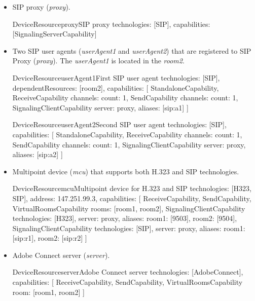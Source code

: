 \begin{itemize}
\item SIP proxy (\emph{proxy}).

\begin{ResourceExample}{DeviceResource}{proxy}{SIP proxy}
technologies: [SIP], 
capabilities: [SignalingServerCapability]
\end{ResourceExample}

\item Two SIP user agents (\emph{userAgent1} and \emph{userAgent2}) that are
  registered to SIP Proxy (\emph{proxy}). The \emph{userAgent1} is located in
  the \emph{room2}.
  
\begin{ResourceExample}{DeviceResource}{userAgent1}{First SIP user agent}
technologies: [SIP],
dependentResources: [room2],
capabilities: [
  StandaloneCapability,
  ReceiveCapability {channels: {count: 1}},
  SendCapability {channels: {count: 1}},
  SignalingClientCapability {server: proxy, aliases: [sip:a1]}
]
\end{ResourceExample}

\begin{ResourceExample}{DeviceResource}{userAgent2}{Second SIP user agent}
technologies: [SIP],
capabilities: [
  StandaloneCapability,
  ReceiveCapability {channels: {count: 1}},
  SendCapability {channels: {count: 1}},
  SignalingClientCapability {server: proxy, aliases: [sip:a2]}
]
\end{ResourceExample}

\item Multipoint device (\emph{mcu}) that supports both H.323 and SIP 
  technologies.
  
\begin{ResourceExample}{DeviceResource}{mcu}{Multipoint device for H.323 and SIP}
technologies: [H323, SIP], 
address: 147.251.99.3,
capabilities: [
  ReceiveCapability,
  SendCapability,
  VirtualRoomsCapability {rooms: [room1, room2]},
  SignalingClientCapability {technologies: [H323], server: proxy, 
     aliases: {room1: [9503], room2: [9504]}},
  SignalingClientCapability {technologies: [SIP], server: proxy, 
     aliases: {room1: [sip:r1], room2: [sip:r2]}}
]
\end{ResourceExample}

\item Adobe Connect server (\emph{server}).

\begin{ResourceExample}{DeviceResource}{server}{Adobe Connect server}
technologies: [AdobeConnect],
capabilities: [
  ReceiveCapability,
  SendCapability,
  VirtualRoomsCapability {room: [room1, room2]}
]
\end{ResourceExample}


\end{itemize}
